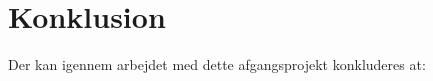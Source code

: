 \chapter{Konklusion} \label{kap:konklusion}
Der kan igennem arbejdet med dette afgangsprojekt konkluderes at: